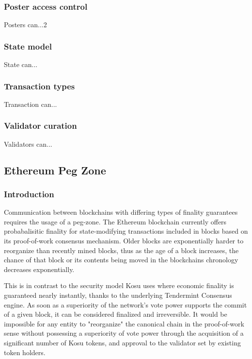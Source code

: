 \documentclass[10pt]{article}
\begin{document}
\subsubsection{Poster access control}\label{tm-network-access}
Posters can...2

\subsubsection{State model}\label{tm-network-state}
State can...

\subsubsection{Transaction types}\label{tm-network-tx-types}
Transaction can...

\subsubsection{Validator curation}\label{tm-network-validators}
Validators can...
\bigskip


\subsection{Ethereum Peg Zone}\label{peg}
\subsubsection{Introduction}\label{peg-intro}
Communication between blockchains with differing types of finality guarantees requires the usage of a peg-zone. The Ethereum blockchain currently offers probabalisitic finality for state-modifying transactions included in blocks based on its proof-of-work consensus mechanism. Older blocks are exponentially harder to reorganize\cite{blockchain-taxonomy} than recently mined blocks, thus as the age of a block increases, the chance of that block or its contents being moved in the blockchains chronology decreases exponentially.
\medskip

This is in contrast to the security model Kosu uses where economic finality is guaranteed nearly instantly, thanks to the underlying Tendermint Consensus\cite{tendermint, tendermint-wp} engine. As soon as a superiority of the network's vote power supports the commit of a given block, it can be considered finalized and irreversible. It would be impossible for any entity to "reorganize" the canonical chain in the proof-of-work sense without possessing a superiority of vote power through the acquisition of a significant number of Kosu tokens, and approval to the validator set by existing token holders.
\medskip
\end{document}
